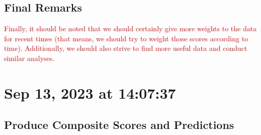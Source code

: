 \documentclass[11pt]{article}
\begin{document}
    \subsection{Final Remarks}
    \textcolor{red}{Finally, it should be noted that we should certainly give more weights to the data for recent times (that means, we should try to weight those scores according to time). Additionally, we should also strive to find more useful data and conduct similar analyses.}
    \section{Sep 13, 2023 at 14:07:37}
    \subsection{Produce Composite Scores and Predictions}
    
\end{document}
